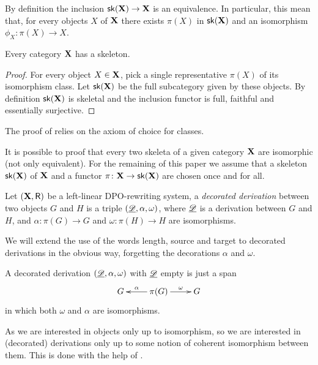 \begin{remark}
	By definition the inclusion $\mathsf{sk}(\textbf {\textup{X}}) \to \textbf {\textup{X}}$ is an equivalence. In particular, this mean that, for every objects $X$ of $\textbf {\textup{X}}$ there exists $\pi(X)$ in $\mathsf{sk}(\textbf {\textup{X}})$ and an isomorphism $\phi_X\colon \pi(X) \to X$.
\end{remark}

\begin{proposition}\label{prop:ske}
	Every category $\textbf {\textup{X}}$ has a skeleton. 
\end{proposition}
\begin{proof}
	For every object $X\in \textbf {\textup{X}}$, pick a single representative $\pi(X)$ of its isomorphism class. Let $\mathsf{sk}(\textbf {\textup{X}})$ be the full subcategory given by these objects. By definition $\mathsf{sk}(\textbf {\textup{X}})$ is skeletal and the inclusion functor is full, faithful and essentially surjective.\qedhere 
\end{proof}
\begin{remark}
	The proof of  relies on the axiom of choice for classes.
\end{remark}
\begin{remark}
	It is possible to proof that every two skeleta of a given category $\textbf {\textup{X}}$ are isomorphic (not only equivalent). For the remaining of this paper we assume that a skeleton $\mathsf{sk}(\textbf {\textup{X}})$ of $\textbf {\textup{X}}$ and a functor $\pi\colon \textbf {\textup{X}}\to \mathsf{sk}(\textbf {\textup{X}})$ are chosen once and for all.
\end{remark}

\begin{definition}
	Let $(\textbf {\textup{X}}, \mathsf{R})$ be a left-linear DPO-rewriting system, a \emph{decorated derivation} between two objects $G$ and $H$ is a triple $(\underline{\mathscr{D}}, \alpha, \omega)$, where $\underline{\mathscr{D}}$ is a derivation between $G$ and $H$, and $\alpha\colon \pi(G)\to G$ and $\omega\colon \pi(H)\to H$ are isomorphisms.
\end{definition}

\begin{notation}
	We will extend the use of the words length, source and target to decorated derivations in the obvious way, forgetting the decorations $\alpha$ and $\omega$.
\end{notation}

\begin{example}A decorated derivation $(\underline{\mathscr{D}}, \alpha, \omega)$ with $\underline{\mathscr{D}}$ empty is just a span
	\[\xymatrix{G & \pi(G) \ar[r]^-{\omega} \ar[l]_-{\alpha} & G}\]
	in which both $\omega$ and $\alpha$ are isomorphisms.
\end{example}

As we are interested in objects only up to isomorphism, so we are interested in (decorated) derivations only up to some notion of coherent isomorphism between them. This is done with the help of .

